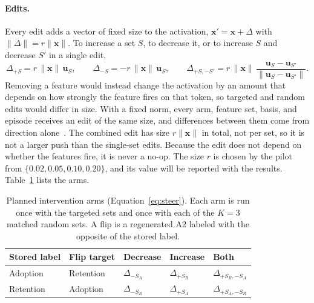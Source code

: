 \paragraph{Edits.} Every edit adds a vector of fixed size to the activation,
$\mathbf{x}' = \mathbf{x} + \Delta$ with $\|\Delta\| = r\|\mathbf{x}\|$. To
increase a set $S$, to decrease it, or to increase $S$ and decrease $S'$ in a
single edit,
\begin{equation}
  \Delta_{+S} = r\,\|\mathbf{x}\|\,\mathbf{u}_S, \qquad
  \Delta_{-S} = -r\,\|\mathbf{x}\|\,\mathbf{u}_S, \qquad
  \Delta_{+S,-S'} = r\,\|\mathbf{x}\|\,
    \frac{\mathbf{u}_S - \mathbf{u}_{S'}}{\|\mathbf{u}_S - \mathbf{u}_{S'}\|}.
  \label{eq:steer}
\end{equation}
Removing a feature would instead change the activation by an amount that
depends on how strongly the feature fires on that token, so targeted and
random edits would differ in size. With a fixed norm, every arm, feature set,
basis, and episode receives an edit of the same size, and differences between
them come from direction
alone~\cite{turner2023steering,rimsky2024steering}. The combined edit has size
$r\|\mathbf{x}\|$ in total, not per set, so it is not a larger push than the
single-set edits. Because the edit does not depend on whether the features
fire, it is never a no-op. The size $r$ is chosen by the pilot from
$\{0.02, 0.05, 0.10, 0.20\}$, and its value will be reported with the results.
Table~\ref{tab:arms} lists the arms.

\begin{table}[t]
  \centering
  \small
  \caption{Planned intervention arms (Equation~\ref{eq:steer}). Each arm is
  run once with the targeted sets and once with each of the $K = 3$ matched
  random sets. A flip is a regenerated A2 labeled with the opposite of the
  stored label.}
  \label{tab:arms}
  \begin{tabular}{@{}lllll@{}}
    \toprule
    Stored label & Flip target & Decrease & Increase & Both \\
    \midrule
    Adoption  & Retention & $\Delta_{-S_A}$ & $\Delta_{+S_R}$
      & $\Delta_{+S_R,-S_A}$ \\
    Retention & Adoption  & $\Delta_{-S_R}$ & $\Delta_{+S_A}$
      & $\Delta_{+S_A,-S_R}$ \\
    \bottomrule
  \end{tabular}
\end{table}

